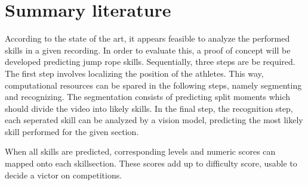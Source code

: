 \section{Summary literature}
\label{lit:-summary-literature}

According to the state of the art, it appears feasible to analyze the performed skills in a given recording. In order to evaluate this, a proof of concept will be developed predicting jump rope skills. Sequentially, three steps are be required. The first step involves localizing the position of the athletes. This way, computational resources can be spared in the following steps, namely segmenting and recognizing. The segmentation consists of predicting split moments which should divide the video into likely skills. In the final step, the recognition step, each seperated skill can be analyzed by a vision model, predicting the most likely skill performed for the given section.

When all skills are predicted, corresponding levels and numeric scores can mapped onto each skillsection. These scores add up to difficulty score, usable to decide a victor on competitions.